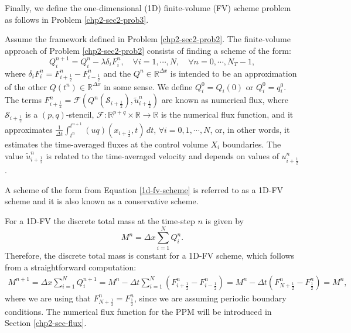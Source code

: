 Finally, we define the one-dimensional (1D) finite-volume (FV)
scheme problem as follows in Problem \ref{chp2-sec2-prob3}.
\begin{prob}[1D-FV scheme]
	\label{chp2-sec2-prob3}
	Assume the framework defined in Problem \ref{chp2-sec2-prob2}.
	The finite-volume approach of Problem \ref{chp2-sec2-prob2}
	consists of finding a scheme of the form:
        \begin{equation}
					\label{1d-fv-scheme}
		{Q}_{i}^{n+1} =  {Q}_{i}^{n} -
            \lambda \delta_i {F}_{i}^{n},
                \quad \forall i = 1, \cdots, N,
                \quad \forall n = 0, \cdots, N_T-1,
        \end{equation}
	where $\delta_i {F}_{i}^{n} = 
    {F}_{i+\frac{1}{2}}^{n} - {F}_{i-\frac{1}{2}}^{n}$
    and the ${Q}^{n} \in \mathbb{R}^{\Delta x}$ is intended to be an approximation
	of the other  ${Q}(t^{n})\in \mathbb{R}^{\Delta x}$ in some sense. We define
    ${Q}_{i}^{0} = {Q}_i(0)$ or ${Q}_{i}^{0} = {q}^{0}_{i}$. 
	The terms ${F}_{i+\frac{1}{2}}^{n} = \mathcal{F}
    (Q^{n}(\mathcal{S}_{i+\frac{1}{2}} ), \tilde{u}^n_{i+\frac{1}{2}})$ are known as numerical flux, 
    where $\mathcal{S}_{i+\frac{1}{2}}$ is a $(p,q)$-stencil, $\mathcal{F}:\mathbb{R}^{p+q}\times \mathbb{R} \to \mathbb{R}$ 
    is the numerical flux function, and it approximates
	$\frac{1}{\Delta t}\int_{t^{n}}^{t^{n+1}} 
    {(uq)}(x_{i+\frac{1}{2}}, t) \,dt $,
	$\forall i = 0, 1, \cdots, N$,
	or, in other words, it estimates the time-averaged fluxes at
    the control volume $X_i$ boundaries. The value $\tilde{u}_{i+\frac{1}{2}}^n$ is related to the time-averaged velocity
    and depends on values of $u_{i+\frac{1}{2}}^n$.
\end{prob}
\begin{remark}
	A scheme of the form from Equation \eqref{1d-fv-scheme} is referred to as a 1D-FV scheme and
	it is also known as a conservative scheme.
\end{remark}
For a 1D-FV the discrete total mass at the time-step $n$ is given by
\begin{equation*}
	M^n =  \Delta x \sum_{i=1}^N Q_i^n.
\end{equation*}
Therefore, the discrete total mass is constant for a 1D-FV scheme,
which follows from a straightforward computation:
\begin{align*}
	M^{n+1} =  \Delta x \sum_{i=1}^N Q_i^{n+1}
					= M^{n} - \Delta t  \sum_{i=1}^N (F^n_{i+\frac{1}{2}}- F^n_{i-\frac{1}{2}})
					= M^{n} - \Delta t (F^n_{N+\frac{1}{2}}- F^n_{\frac{1}{2}})
					= M^{n},
\end{align*}
where we are using that $F^n_{N+\frac{1}{2}} = F^n_{\frac{1}{2}}$, since we are assuming periodic boundary
conditions.
The numerical flux function for the PPM will be introduced in Section \ref{chp2-sec-flux}.

